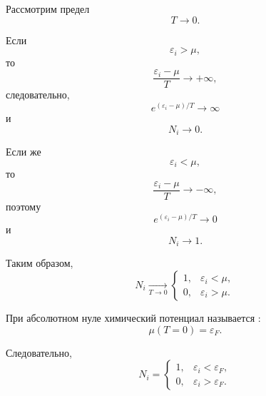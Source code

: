 \documentclass[../final.tex]{subfiles}
\begin{document}
Рассмотрим предел
%
\begin{equation*}
    T
    \rightarrow
    0.
\end{equation*}

Если
%
\begin{equation*}
    \varepsilon_i
    >
    \mu,
\end{equation*}
%
то
%
\begin{equation*}
    \frac{
        \varepsilon_i-\mu
    }{
        T
    }
    \rightarrow
    +\infty,
\end{equation*}
%
следовательно,
%
\begin{equation*}
    e^{(\varepsilon_i-\mu)/T}
    \rightarrow
    \infty
\end{equation*}
%
и
%
\begin{equation*}
    N_i
    \rightarrow
    0.
\end{equation*}

Если же
%
\begin{equation*}
    \varepsilon_i
    <
    \mu,
\end{equation*}
%
то
%
\begin{equation*}
    \frac{
        \varepsilon_i-\mu
    }{
        T
    }
    \rightarrow
    -\infty,
\end{equation*}
%
поэтому
%
\begin{equation*}
    e^{(\varepsilon_i-\mu)/T}
    \rightarrow
    0
\end{equation*}
%
и
%
\begin{equation*}
    N_i
    \rightarrow
    1.
\end{equation*}

Таким образом,
%
\[
    \boxed{
        N_i
        \underset{T\rightarrow0}{\longrightarrow}
        \begin{cases}
            1,
            &
            \varepsilon_i<\mu,
            \\[2mm]
            0,
            &
            \varepsilon_i>\mu.
        \end{cases}
    }
\]

При абсолютном нуле химический потенциал называется
:
%
\[
    \boxed{
        \mu(T=0)
        =
        \varepsilon_F
    }.
\]

Следовательно,
%
\begin{equation*}
    N_i
    =
    \begin{cases}
        1,
        &
        \varepsilon_i<\varepsilon_F,
        \\[2mm]
        0,
        &
        \varepsilon_i>\varepsilon_F.
    \end{cases}
\end{equation*}
\end{document}
